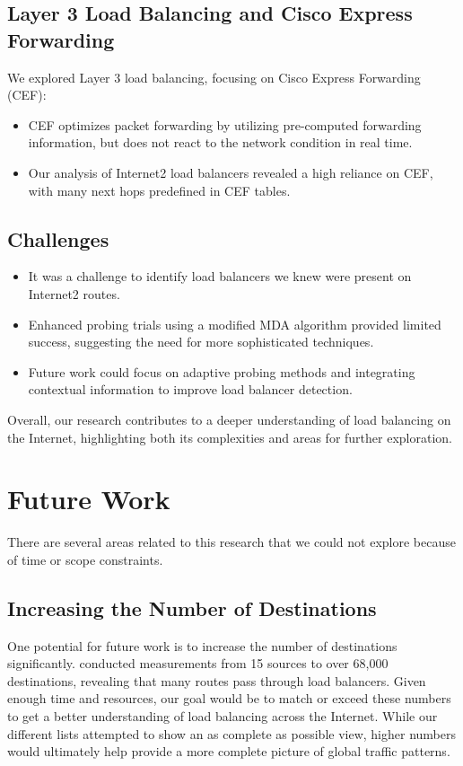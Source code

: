 \documentclass[12pt]{cwru_thesis}
\begin{document}
\section*{Layer 3 Load Balancing and Cisco Express Forwarding}

We explored Layer 3 load balancing, focusing on Cisco Express Forwarding (CEF):
\begin{itemize}
    \item CEF optimizes packet forwarding by utilizing pre-computed forwarding information, but does not react to the network condition in real time.
    \item Our analysis of Internet2 load balancers revealed a high reliance on CEF, with many next hops predefined in CEF tables. 
\end{itemize}

\section*{Challenges}

\begin{itemize}
    \item It was a challenge to identify load balancers we knew were present on Internet2 routes.
    \item Enhanced probing trials using a modified MDA algorithm provided limited success, suggesting the need for more sophisticated techniques.
    \item Future work could focus on adaptive probing methods and integrating contextual information to improve load balancer detection.
\end{itemize}

Overall, our research contributes to a deeper understanding of load balancing on the Internet, highlighting both its complexities and areas for further exploration.

\chapter{Future Work}

There are several areas related to this research that we could not explore because of time or scope constraints. 

\section*{Increasing the Number of Destinations}

One potential for future work is to increase the number of destinations significantly. \textbf{\cite{augustin2010measuring} }conducted measurements from 15 sources to over 68,000 destinations, revealing that many routes pass through load balancers. Given enough time and resources, our goal would be to match or exceed these numbers to get a better understanding of load balancing across the Internet. While our different lists attempted to show an as complete as possible view, higher numbers would ultimately help provide a more complete picture of global traffic patterns.
\end{document}
